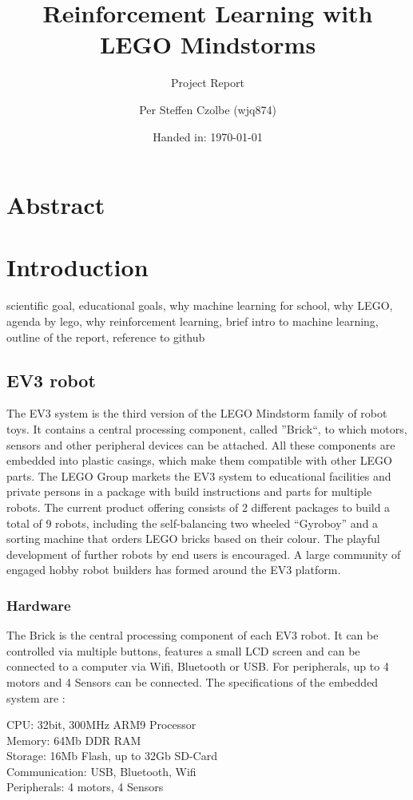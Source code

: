 \documentclass[11pt, a4paper]{article}
\author{Per Steffen Czolbe (wjq874)}
\title{Reinforcement Learning with LEGO Mindstorms}
\subtitle{Project Report}
\date{Handed in: \today}
\begin{document}
\maketitle

\section{Abstract}

\tableofcontents


\section{Introduction}
scientific goal,
educational goals,
why machine learning for school,
why LEGO,
agenda by lego,
why reinforcement learning,
brief intro to machine learning,
outline of the report,
reference to github

\subsection{EV3 robot}
The EV3 system is the third version of the LEGO Mindstorm family of robot toys. It contains a central processing component, called ''Brick``, to which motors, sensors and other peripheral devices can be attached. All these components are embedded into plastic casings, which make them compatible with other LEGO parts. The LEGO Group markets the EV3 system to educational facilities and private persons in a package with build instructions and parts for multiple robots. The current product offering consists of 2 different packages to build a total of 9 robots, including the self-balancing two wheeled ``Gyroboy'' and a sorting machine that orders LEGO bricks based on their colour. The playful development of further robots by end users is encouraged. A large community of engaged hobby robot builders has formed around the EV3 platform.

\subsubsection*{Hardware}
The Brick is the central processing component of each EV3 robot. It can be controlled via multiple buttons, features a small LCD screen and can be connected to a computer via Wifi, Bluetooth or USB. For peripherals, up to 4 motors and 4 Sensors can be connected. The specifications of the embedded system are \cite{ev3_dev_toolkit}:
\begin{listing}
	CPU: 32bit, 300MHz ARM9 Processor \\
	Memory: 64Mb DDR RAM\\
	Storage: 16Mb Flash, up to 32Gb SD-Card \\
	Communication: USB, Bluetooth, Wifi \\
	Peripherals: 4 motors, 4 Sensors
\end{listing}
\end{document}
